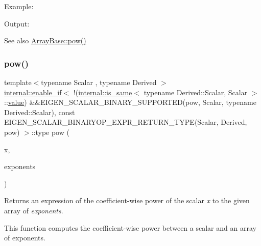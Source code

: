 Example\+: 
\begin{DoxyCodeInclude}{0}
\end{DoxyCodeInclude}
 Output\+: 
\begin{DoxyVerbInclude}
\end{DoxyVerbInclude}


\begin{DoxySeeAlso}{See also}
\mbox{\hyperlink{class_eigen_1_1_array_base_ab6dc101d82e8228a19a8840e3a29c1c9}{Array\+Base\+::pow()}} 
\end{DoxySeeAlso}
\mbox{\label{class_eigen_1_1_array_base_a7db6f1ad242a31a2fa421f500d1258c5}} 
\subsubsection{\texorpdfstring{pow()}{pow()}\hspace{0.1cm}{\footnotesize\ttfamily [3/3]}}
{\footnotesize\ttfamily template$<$typename Scalar , typename Derived $>$ \\
\mbox{\hyperlink{struct_eigen_1_1internal_1_1enable__if}{internal\+::enable\+\_\+if}}$<$ !(\mbox{\hyperlink{struct_eigen_1_1internal_1_1is__same}{internal\+::is\+\_\+same}}$<$ typename Derived\+::\+Scalar, Scalar $>$\+::\mbox{\hyperlink{class_eigen_1_1_dense_base_a8da735a6bfc7012606acf787156d10a0}{value}}) \&\&E\+I\+G\+E\+N\+\_\+\+S\+C\+A\+L\+A\+R\+\_\+\+B\+I\+N\+A\+R\+Y\+\_\+\+S\+U\+P\+P\+O\+R\+T\+ED(pow, Scalar, typename Derived\+::\+Scalar), const E\+I\+G\+E\+N\+\_\+\+S\+C\+A\+L\+A\+R\+\_\+\+B\+I\+N\+A\+R\+Y\+O\+P\+\_\+\+E\+X\+P\+R\+\_\+\+R\+E\+T\+U\+R\+N\+\_\+\+T\+Y\+PE(Scalar, Derived, pow) $>$\+::type pow (\begin{DoxyParamCaption}\item[{const Scalar \&}]{x,  }\item[{const \mbox{\hyperlink{class_eigen_1_1_array_base}{Eigen\+::\+Array\+Base}}$<$ Derived $>$ \&}]{exponents }\end{DoxyParamCaption})\hspace{0.3cm}{\ttfamily [related]}}

\begin{DoxyReturn}{Returns}
an expression of the coefficient-\/wise power of the scalar {\itshape x} to the given array of {\itshape exponents}.
\end{DoxyReturn}
This function computes the coefficient-\/wise power between a scalar and an array of exponents.


